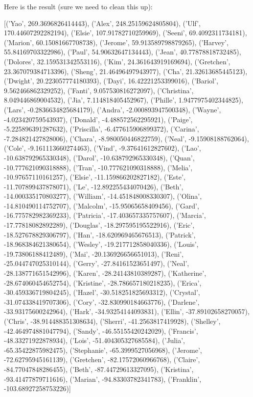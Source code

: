 \documentclass{icmmcm}
\begin{document}
Here is the result (sure we need to clean this up):


[('Yao', 269.3696826414443), ('Alex', 248.25159624805804), ('Ulf', 170.44607292282194), ('Elsie', 107.91782710259969), ('Seeni', 69.4092311734181), ('Marion', 60.15081667708738), ('Jerome', 59.913589798879265), ('Harvey', 55.84169703322986), ('Paul', 54.90632647134443), ('Jean', 40.77878818732485), ('Dolores', 32.159531342553116), ('Kim', 24.361643919169694), ('Gretchen', 23.367079384713396), ('Sheng', 21.46496497943977), ('Cha', 21.32613685445123), ('Dwight', 20.223057774180393), ('Dayi', 16.42221253399016), ('Bariol', 9.562466862329252), ('Fanti', 9.057530816272097), ('Christina', 8.049446869004532), ('Jia', 7.114818405452967), ('Phille', 1.9477975402344825), ('Lars', -0.2836634825684179), ('Andra', -2.000893947500348), ('Wayne', -4.023420759543937), ('Donald', -4.488572562295921), ('Paige', -5.225896391287632), ('Priscilla', -6.477615906899372), ('Carina', -7.284821427828006), ('Chara', -8.980050446822759), ('Neal', -9.15908188762064), ('Cole', -9.161113660274463), ('Vind', -9.37641612827602), ('Lao', -10.638792965330348), ('Darol', -10.638792965330348), ('Quan', -10.777621090318888), ('Tran', -10.777621090318888), ('Melia', -10.97657110161257), ('Elsie', -11.159866202827182), ('Este', -11.707899437878071), ('Le', -12.892255434070426), ('Beth', -14.000335170803277), ('William', -14.451848008330307), ('Olina', -14.810490114752707), ('Malcolm', -15.95065658409456), ('Gard', -16.775782982369233), ('Patricia', -17.403657335757607), ('Marcia', -17.77818082892289), ('Douglas', -18.297595195522916), ('Eric', -18.527678829306797), ('Han', -18.620969465676513), ('Patrick', -18.968384621380654), ('Wesley', -19.217712858040336), ('Louis', -19.73806188412489), ('Mai', -20.136926656651013), ('Reni', -25.044747025310144), ('Gerry', -27.84161523651497), ('Neal', -28.138771651542996), ('Karen', -28.24143810389287), ('Katherine', -28.674060454652754), ('Kristine', -28.786657180218235), ('Erica', -30.459336719804245), ('Hazel', -30.518251825693312), ('Crystal', -31.074338419707306), ('Cory', -32.830990184663776), ('Darlene', -33.93175600242964), ('Hark', -34.93254144093831), ('Ellin', -37.89102658270057), ('Chris', -38.914488351308634), ('Sherri', -41.2563817419928), ('Shelley', -42.464974881047794), ('Sandy', -46.55155420242029), ('Francis', -48.33271922878934), ('Lois', -51.404305327685584), ('Julia', -65.35422875982475), ('Stephanie', -65.3999527056968), ('Jerome', -72.62795945161139), ('Gretchen', -82.17572060966768), ('Claire', -84.77047848286455), ('Beth', -87.44729613327095), ('Kristina', -93.41477879711616), ('Marian', -94.83303782341783), ('Franklin', -103.68927258753226)]
\end{document}
